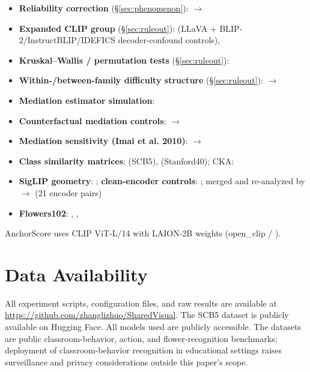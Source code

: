 \documentclass[a4paper,fleqn]{cas-sc}
\begin{document}
\begin{itemize}
  \item \textbf{Reliability correction} (\S\ref{sec:phenomenon}):  \hfill\break $\rightarrow$ 
  \item \textbf{Expanded CLIP group} (\S\ref{sec:ruleout}):  (LLaVA + BLIP-2/InstructBLIP/IDEFICS decoder-confound controls), 
  \item \textbf{Kruskal--Wallis / permutation tests} (\S\ref{sec:ruleout}): 
  \item \textbf{Within-/between-family difficulty structure} (\S\ref{sec:ruleout}):  \hfill\break $\rightarrow$ 
  \item \textbf{Mediation estimator simulation}: 
  \item \textbf{Counterfactual mediation controls}:  \hfill\break $\rightarrow$ 
  \item \textbf{Mediation sensitivity (Imai et al. 2010)}:  \hfill\break $\rightarrow$ 
  \item \textbf{Class similarity matrices}:  (SCB5),  (Stanford40); CKA: 
  \item \textbf{SigLIP geometry}: ; \textbf{clean-encoder controls}: ; merged and re-analyzed by  \hfill\break $\rightarrow$  (21 encoder pairs)
  \item \textbf{Flowers102}: , , 
\end{itemize}

AnchorScore uses CLIP ViT-L/14 with LAION-2B weights (open\_clip  / ).

\section{Data Availability}
All experiment scripts, configuration files, and raw results are available at \url{https://github.com/zhanglizhuo/SharedVisual}. The SCB5 dataset is publicly available on Hugging Face. All models used are publicly accessible. The datasets are public classroom-behavior, action, and flower-recognition benchmarks; deployment of classroom-behavior recognition in educational settings raises surveillance and privacy considerations outside this paper's scope.



\end{document}
